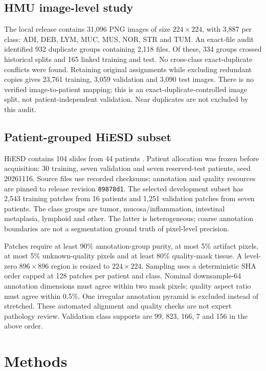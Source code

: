 \documentclass[conference]{IEEEtran}
\begin{document}
\subsection{HMU image-level study}
The local release contains 31,096 PNG images of size $224\times224$, with 3,887 per class: ADI, DEB, LYM, MUC, MUS, NOR, STR and TUM. An exact-file audit identified 932 duplicate groups containing 2,118 files. Of these, 334 groups crossed historical splits and 165 linked training and test. No cross-class exact-duplicate conflicts were found. Retaining original assignments while excluding redundant copies gives 23,761 training, 3,059 validation and 3,090 test images. There is no verified image-to-patient mapping; this is an exact-duplicate-controlled image split, not patient-independent validation. Near duplicates are not excluded by this audit.

\subsection{Patient-grouped HiESD subset}
HiESD contains 104 slides from 44 patients \cite{wang}. Patient allocation was frozen before acquisition: 30 training, seven validation and seven reserved-test patients, seed 20261116. Source files use recorded checksums; annotation and quality resources are pinned to release revision \texttt{89878d1}. The selected development subset has 2,543 training patches from 16 patients and 1,251 validation patches from seven patients. The class groups are tumor, mucosa/inflammation, intestinal metaplasia, lymphoid and other. The latter is heterogeneous; coarse annotation boundaries are not a segmentation ground truth of pixel-level precision.

Patches require at least 90\% annotation-group purity, at most 5\% artifact pixels, at most 5\% unknown-quality pixels and at least 80\% quality-mask tissue. A level-zero $896\times896$ region is resized to $224\times224$. Sampling uses a deterministic SHA order capped at 128 patches per patient and class. Nominal downsample-64 annotation dimensions must agree within two mask pixels; quality aspect ratio must agree within 0.5\%. One irregular annotation pyramid is excluded instead of stretched. These automated alignment and quality checks are not expert pathology review. Validation class supports are 99, 823, 166, 7 and 156 in the above order.

\section{Methods}
\end{document}
